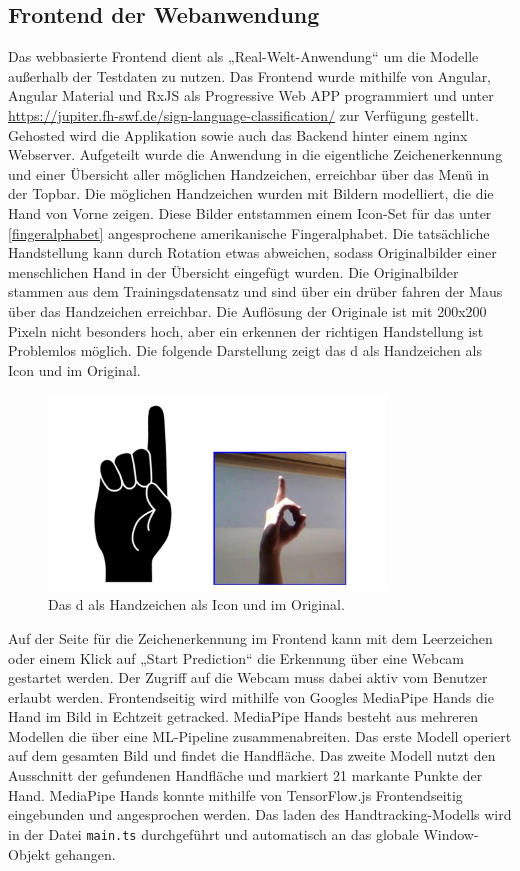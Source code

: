 \documentclass[11pt,bibliography=totocnumbered]{scrartcl}
\begin{document}
\subsection{Frontend der Webanwendung}
Das webbasierte Frontend dient als „Real-Welt-Anwendung“ um die Modelle außerhalb der Testdaten zu nutzen. Das Frontend wurde mithilfe von Angular, Angular Material und RxJS als Progressive Web APP programmiert und unter \url{https://jupiter.fh-swf.de/sign-language-classification/} zur Verfügung gestellt. Gehosted wird die Applikation sowie auch das Backend hinter einem nginx Webserver. Aufgeteilt wurde die Anwendung in die eigentliche Zeichenerkennung und einer Übersicht aller möglichen Handzeichen, erreichbar über das Menü in der Topbar. Die möglichen Handzeichen wurden mit Bildern modelliert, die die Hand von Vorne zeigen. Diese Bilder entstammen einem Icon-Set für das unter \ref{fingeralphabet} angesprochene amerikanische Fingeralphabet. Die tatsächliche Handstellung kann durch Rotation etwas abweichen, sodass Originalbilder einer menschlichen Hand in der Übersicht eingefügt wurden. Die Originalbilder stammen aus dem Trainingsdatensatz und sind über ein drüber fahren der Maus über das Handzeichen erreichbar. Die Auflösung der Originale ist mit 200x200 Pixeln nicht besonders hoch, aber ein erkennen der richtigen Handstellung ist Problemlos möglich. Die folgende Darstellung zeigt das d als Handzeichen als Icon und im Original.
\begin{figure}[H]
	\centering
	\includegraphics[width=0.80\textwidth]{d}
	\vspace*{-3mm}
	\caption[D als Handzeichen als Icon und im Original]{Das d als Handzeichen als Icon und im Original.}
	\label{fig:d}
\end{figure}
Auf der Seite für die Zeichenerkennung im Frontend kann mit dem Leerzeichen oder einem Klick auf „Start Prediction“ die Erkennung über eine Webcam gestartet werden. Der Zugriff auf die Webcam muss dabei aktiv vom Benutzer erlaubt werden. Frontendseitig wird mithilfe von Googles MediaPipe Hands die Hand im Bild in Echtzeit getracked. MediaPipe Hands besteht aus mehreren Modellen die über eine ML-Pipeline zusammenabreiten. Das erste Modell operiert auf dem gesamten Bild und findet die Handfläche. Das zweite Modell nutzt den Ausschnitt der gefundenen Handfläche und markiert 21 markante Punkte der Hand. MediaPipe Hands konnte mithilfe von TensorFlow.js Frontendseitig eingebunden und angesprochen werden. Das laden des Handtracking-Modells wird in der Datei \lstinline[language=pythoninline]|main.ts| durchgeführt und automatisch an das globale Window-Objekt gehangen.
\end{document}
